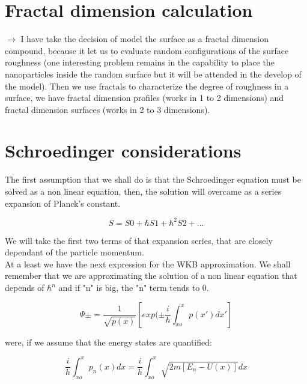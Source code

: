 \documentclass[11pt,a4paper,draft]{article}
\newcommand{\forceindent}{\leavevmode{\parindent=3em\indent}}
\begin{document}
\section{Fractal dimension calculation} 

$\rightarrow$ I have take the decision of model the surface as a fractal dimension compound, because it let us to evaluate random configurations of the surface roughness (one interesting problem remains in the capability to place the nanoparticles inside the random surface but it will be attended in the develop of the model). Then we use fractals to characterize the degree of roughness in a surface, we have fractal dimension profiles (works in 1 to 2 dimensions) and fractal dimension surfaces (works in 2 to 3 dimensions).

\section{Schroedinger considerations}
\forceindent The first assumption that we shall do is that the Schroedinger equation must be solved as a non linear equation, then, the solution will overcame as a series expansion of Planck's constant.\\
\begin{center}
    \begin{equation}
        S=S0+\hbar S1+{ \hbar  }^{ 2 }S2+...
    \end{equation}
\end{center}
\forceindent We will take the first two terms of that expansion series, that are closely dependant of the particle momentum.\\
\forceindent At a least we have the next expression for the WKB approximation. We shall remember that we are approximating the solution of a non linear equation that depends of $\hbar^{n}$ and if "n" is big, the "n" term tends to 0.
\begin{center}
    \begin{equation}
 \Psi \pm =\frac { 1 }{ \sqrt { p(x) }  } \left[ exp(\pm \frac { i }{ h } \int _{ xo }^{ x }{ p(x')dx'}  \right] 
    \end{equation}
\end{center}

were, if we assume that the energy states are quantified: 

\begin{center}
    \begin{equation}
\frac { i }{ h } \int _{ xo }^{ x }{ { p }_{ n }(x)dx } =\frac { i }{ h } \int _{ xo }^{ x }{ \sqrt { 2m[{ E }_{ n }-U(x)] } dx } 
    \end{equation}
\end{center}
\end{document}
